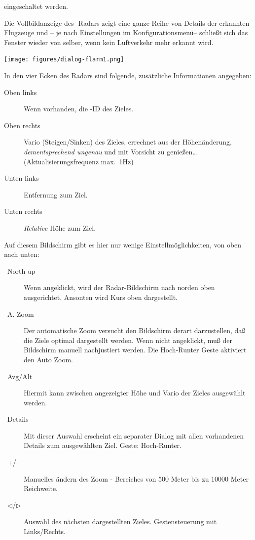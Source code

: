 eingeschaltet werden.

Die Vollbildanzeige des \fl-Radars zeigt eine ganze Reihe von Details der erkannten Flugzeuge und -- je
nach Einstellungen im Konfigurationsmenü-- schließt sich das Fenster wieder von selber, wenn
kein Luftverkehr mehr erkannt wird.

\begin{center}
\texttt{[image: figures/dialog-flarm1.png]}
\end{center}

In den vier Ecken des Radars sind folgende, zusätzliche Informationen angegeben:
\begin{description}
\item[Oben links]  Wenn vorhanden, die \fl-ID des Zieles.
\item[Oben rechts] Vario (Steigen/Sinken) des Zieles, errechnet aus der Höhenänderung,
\textsl{dementsprechend ungenau} und mit Vorsicht zu genießen\dots (Aktualisierungsfrequenz max.\ 1Hz)
\item[Unten links]  Entfernung zum Ziel.
\item[Unten rechts]  \textsl{Relative} Höhe zum Ziel.
\end{description}
\vspace{1em}

Auf diesem Bildschirm gibt es hier nur wenige Einstellmöglichkeiten, von oben nach unten:

\begin{description}
\item[~North up~]  Wenn angeklickt, wird der Radar-Bildschirm nach norden oben ausgerichtet.
Ansonten wird Kurs oben dargestellt.
\item[~A. Zoom~]    Der automatische Zoom versucht den Bildschirm derart darzustellen, daß die
Ziele optimal dargestellt werden.
Wenn nicht angeklickt, muß der Bildschirm manuell nachjustiert werden.
Die Hoch-Runter Geste aktiviert den Auto Zoom.
\item[~Avg/Alt~]   Hiermit kann zwischen angezeigter Höhe und Vario der Zieles ausgewählt werden.
\item[~Details~]    Mit dieser Auswahl erscheint ein separater
Dialog mit allen vorhandenen Details zum ausgewählten Ziel. Geste: Hoch-Runter.
\item[~+/-~ ]  Manuelles ändern des Zoom - Bereiches von 500 Meter bis
zu 10000 Meter Reichweite.
\item[~$\triangleleft$/$\triangleright$~]    Auswahl des nächsten dargestellten Zieles.
Gestensteuerung mit Links/Rechts.
\end{description}

